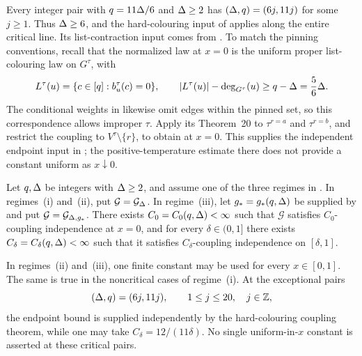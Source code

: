 \begin{remark}
\label{rem:critical-scope}
Every integer pair with \(q=11\Delta/6\) and \(\Delta\ge2\) has
\((\Delta,q)=(6j,11j)\) for some \(j\ge1\).  Thus \(\Delta\ge6\), and
the hard-colouring input of
\cite[Theorem~20 and Proposition~22]{CFFGZZ2024} applies along the
entire critical line.  Its list-contraction input comes from
\cite[Section~6 and Appendix~E]{CDMPP2019}.
To match the pinning conventions, recall that the normalized law at
\(x=0\) is the uniform proper list-colouring law on \(G^\tau\), with
\[
  L^{\tau}(u)=\{c\in[q]:b_u^\tau(c)=0\},
  \qquad
  |L^{\tau}(u)|-\deg_{G^\tau}(u)
  \ge q-\Delta=\frac56\Delta.
\]
The conditional weights in \cite[Section~2]{CFFGZZ2024} likewise omit
edges within the pinned set, so this correspondence allows improper
\(\tau\).  Apply its Theorem~20 to \(\tau^{r=a}\) and
\(\tau^{r=b}\), and restrict the coupling to
\(V^\tau\setminus\{r\}\), to obtain  at \(x=0\).
This supplies the independent endpoint input in
; the positive-temperature estimate there
does not provide a constant uniform as \(x\downarrow0\).
\end{remark}

\begin{theorem}
\label{thm:potts-ci-regimes}
Let \(q,\Delta\) be integers with \(\Delta\ge2\), and assume one of the three
regimes in .  In
regimes~\textup{(i)} and~\textup{(ii)}, put \(\mathcal G=\mathcal{G}_{\Delta}\).  In
regime~\textup{(iii)}, let \(g_*=g_*(q,\Delta)\) be supplied by
 and put \(\mathcal G=\mathcal{G}_{\Delta,g_*}\).
There exists \(C_0=C_0(q,\Delta)<\infty\) such that \(\mathcal G\)
satisfies \(C_0\)-coupling independence at \(x=0\), and for every
\(\delta\in(0,1]\) there exists \(C_\delta=C_\delta(q,\Delta)<\infty\)
such that it satisfies \(C_\delta\)-coupling independence on
\([\delta,1]\).

In regimes~\textup{(ii)} and~\textup{(iii)}, one finite constant may be
used for every \(x\in[0,1]\).  The same is true in the noncritical cases
of regime~\textup{(i)}.  At the exceptional pairs
\[
  (\Delta,q)=(6j,11j),\qquad 1\le j\le20,\quad j\in\mathbb Z,
\]
the endpoint bound is supplied independently by the hard-colouring
coupling theorem, while one may take
\(C_\delta=12/(11\delta)\).  No single uniform-in-\(x\) constant is
asserted at these critical pairs.
\end{theorem}

